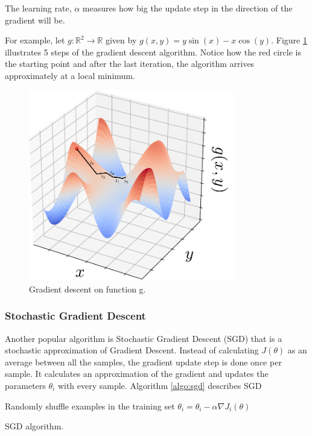 The learning rate, $\alpha$ measures how big the update step in the direction of the gradient will be.

For example, let $g:\mathbb{R}^2\to\mathbb{R}$ given by $g(x,y)=y \sin(x) - x\cos(y)$. Figure \ref{fig:grad_desc}
illustrates 5 steps of the gradient descent algorithm. Notice how the red circle is the starting point and after 
the last iteration, the algorithm arrives approximately at a local minimum.

\begin{figure}[ht]
    \centering
    \includegraphics[width=0.8\textwidth]{Chapter3/func_exam.pdf}
    \caption{Gradient descent on function g.}
    \label{fig:grad_desc}
\end{figure}

\subsubsection{Stochastic Gradient Descent}

Another popular algorithm is Stochastic Gradient Descent (SGD) that is a stochastic approximation of Gradient Descent.
Instead of calculating $J(\theta)$ as an average between all the samples, the gradient update step is done once per sample.
It calculates an approximation of the gradient and updates the parameters $\theta_i$ with every sample.
Algorithm \ref{algo:sgd} describes SGD

\begin{algorithm}[H]
    \DontPrintSemicolon
    \SetAlgoLined
     {
        Randomly shuffle examples in the training set\;
         {
            $\theta_i = \theta_i - \alpha \nabla J_i(\theta)$\;
        }
    }
    \caption{SGD algorithm.}
    \label{algo:sgd}
\end{algorithm}

